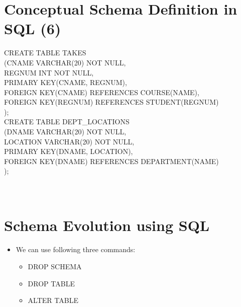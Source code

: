 \documentclass[12pt]{article}
\begin{document}
\begin{itemize}
\begin{itemize}
\begin{itemize}
\section{Conceptual Schema Definition in SQL (6)}
CREATE TABLE TAKES\\ 
(CNAME VARCHAR(20) NOT NULL,\\ 
REGNUM INT NOT NULL,\\ 
PRIMARY KEY(CNAME, REGNUM),\\ 
FOREIGN KEY(CNAME)    REFERENCES COURSE(NAME),\\ 
FOREIGN KEY(REGNUM) REFERENCES STUDENT(REGNUM)\\ 
);\\ 
CREATE TABLE DEPT_LOCATIONS\\ 
(DNAME VARCHAR(20) NOT NULL,\\ 
LOCATION VARCHAR(20) NOT NULL,\\ 
PRIMARY KEY(DNAME, LOCATION),\\ 
FOREIGN KEY(DNAME) REFERENCES DEPARTMENT(NAME)\\ 
);\\ 
\\ 
 \\ 
\section{Schema Evolution using SQL}
\begin{itemize}
  \item We can use following three commands:\\ 
\begin{itemize}
  \item DROP SCHEMA\\ 
  \item DROP TABLE\\ 
  \item ALTER TABLE\\ 
\end{itemize}
\end{itemize}
\\ 
 \\ 

\end{itemize}
\end{itemize}
\end{itemize}
\end{document}
